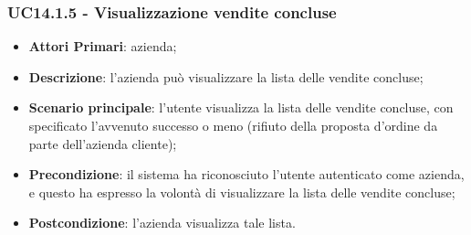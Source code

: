 \subsubsection{UC14.1.5 - Visualizzazione vendite concluse}
\begin{itemize}
	\item \textbf{Attori Primari}: azienda;
	\item \textbf{Descrizione}: l'azienda può visualizzare la lista delle vendite concluse;
	\item \textbf{Scenario principale}: l'utente visualizza la lista delle vendite concluse, con specificato l'avvenuto successo o meno (rifiuto della proposta d'ordine da parte dell'azienda cliente);
	\item \textbf{Precondizione}: il sistema ha riconosciuto l'utente autenticato come azienda, e questo ha espresso la volontà di visualizzare la lista delle vendite concluse;
	\item \textbf{Postcondizione}: l'azienda visualizza tale lista.
\end{itemize}

